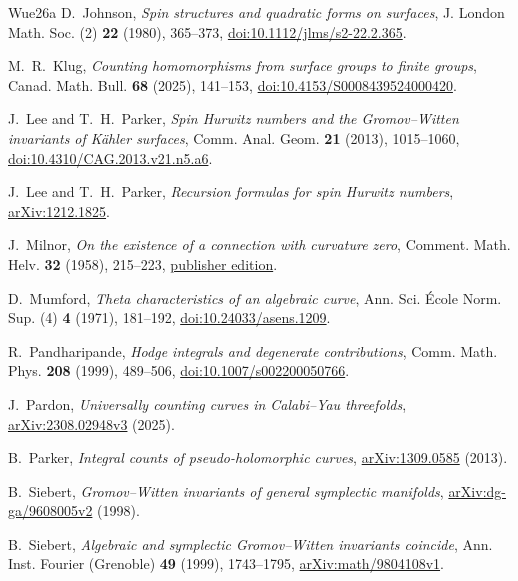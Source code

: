 \begin{thebibliography}{Wue26a}
 D.~Johnson,
\emph{Spin structures and quadratic forms on surfaces},
J. London Math. Soc. (2) \textbf{22} (1980), 365--373,
\href{https://doi.org/10.1112/jlms/s2-22.2.365}{doi:10.1112/jlms/s2-22.2.365}.

 M.~R.~Klug, \emph{Counting homomorphisms from surface groups to finite groups}, Canad. Math. Bull. \textbf{68} (2025), 141--153, \href{https://doi.org/10.4153/S0008439524000420}{doi:10.4153/S0008439524000420}.

 J.~Lee and T.~H.~Parker,
\emph{Spin Hurwitz numbers and the Gromov--Witten invariants of K\"ahler surfaces},
Comm. Anal. Geom. \textbf{21} (2013), 1015--1060,
\href{https://doi.org/10.4310/CAG.2013.v21.n5.a6}{doi:10.4310/CAG.2013.v21.n5.a6}.

 J.~Lee and T.~H.~Parker, \emph{Recursion formulas for spin Hurwitz numbers}, \href{https://arxiv.org/abs/1212.1825}{arXiv:1212.1825}.

 J.~Milnor, \emph{On the existence of a connection with curvature zero}, Comment. Math. Helv. \textbf{32} (1958), 215--223, \href{https://www.e-periodica.ch/view/com-001/1957/32/15}{publisher edition}.

 D.~Mumford, \emph{Theta characteristics of an algebraic curve}, Ann. Sci. \'Ecole Norm. Sup. (4) \textbf{4} (1971), 181--192, \href{https://doi.org/10.24033/asens.1209}{doi:10.24033/asens.1209}.

 R.~Pandharipande,
\emph{Hodge integrals and degenerate contributions},
Comm. Math. Phys. \textbf{208} (1999), 489--506,
\href{https://doi.org/10.1007/s002200050766}{doi:10.1007/s002200050766}.

 J.~Pardon,
\emph{Universally counting curves in Calabi--Yau threefolds},
\href{https://arxiv.org/abs/2308.02948v3}{arXiv:2308.02948v3} (2025).

 B.~Parker,
\emph{Integral counts of pseudo-holomorphic curves},
\href{https://arxiv.org/abs/1309.0585}{arXiv:1309.0585} (2013).

 B.~Siebert,
\emph{Gromov--Witten invariants of general symplectic manifolds},
\href{https://arxiv.org/abs/dg-ga/9608005v2}{arXiv:dg-ga/9608005v2} (1998).

 B.~Siebert,
\emph{Algebraic and symplectic Gromov--Witten invariants coincide},
Ann. Inst. Fourier (Grenoble) \textbf{49} (1999), 1743--1795,
\href{https://arxiv.org/abs/math/9804108v1}{arXiv:math/9804108v1}.


\end{thebibliography}
